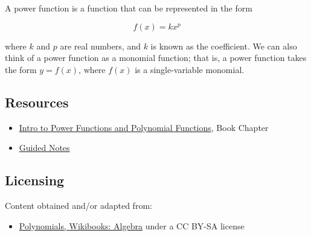 A power function is a function that can be represented in the form



$$f(x) = kx^p$$



where $k$ and $p$ are real numbers, and $k$ is known as the coefficient. We can also think
of a power function as a monomial function; that is, a power function takes the form $y =
f(x)$, where $f(x)$ is a single-variable monomial.




\subsection{Resources}
\label{sss:reso-55b5}




\begin{itemize}
    \item \href{https://mathresearch.utsa.edu/wikiFiles/MAT1053/Intro_to_Polynomial_and_Power_Functions/MAT1053_M2.1Intro_to_Power_Functions_and_Polynomial_Functions.pdf}{Intro to Power Functions and Polynomial Functions}, Book Chapter
    \item \href{https://mathresearch.utsa.edu/wikiFiles/MAT1053/Intro_to_Polynomial_and_Power_Functions/MAT1053_M2.1Intro_to_Power_Functions_and_Polynomial_FunctionsGN.pdf}{Guided Notes}
\end{itemize}


\subsection{Licensing}
\label{sss:lice-735215}




Content obtained and/or adapted from:



\begin{itemize}
    \item \href{https://en.wikibooks.org/wiki/Algebra/Polynomials}{Polynomials, Wikibooks: Algebra} under a CC BY-SA license
\end{itemize}



